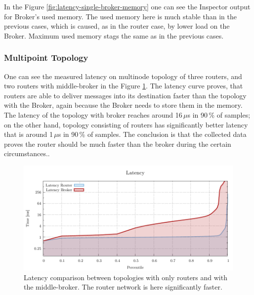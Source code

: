 In the Figure \ref{fig:latency-single-broker-memory} one can see the Inspector output for Broker's used memory. The used memory here is much stable than in the previous cases, which is caused, as in the router case, by lower load on the Broker. Maximum used memory stags the same as in the previous cases.

\subsubsection*{Multipoint Topology}
One can see the measured latency on multinode topology of three routers, and two routers with middle-broker in the Figure \ref{fig:latency-multipoint-router}. The latency curve proves, that routers are able to deliver messages into its destination faster than the topology with the Broker, again because the Broker needs to store them in the memory. The latency of the topology with broker reaches around 16\,$\mu$s in 90\,\% of samples; on the other hand, topology consisting of routers has significantly better latency that is around 1\,$\mu$s in 90\,\% of samples. The conclusion is that the collected data proves the router should be much faster than the broker during the certain circumstances..

\begin{figure}[H]
	\centering
	\includegraphics[width=1\linewidth]{obrazky-figures/charts/multipoint-latency.pdf}
	\caption{Latency comparison between topologies with only routers and with the middle-broker. The router network is here significantly faster.}
	\label{fig:latency-multipoint-router}
\end{figure}

